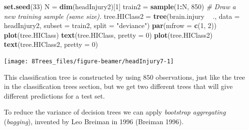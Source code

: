 \documentclass[10pt,ignorenonframetext,]{beamer}
\newenvironment{Shaded}{\begin{snugshade}}{\end{snugshade}}
\newcommand{\KeywordTok}[1]{\textcolor[rgb]{0.13,0.29,0.53}{\textbf{#1}}}
\newcommand{\DataTypeTok}[1]{\textcolor[rgb]{0.13,0.29,0.53}{#1}}
\newcommand{\DecValTok}[1]{\textcolor[rgb]{0.00,0.00,0.81}{#1}}
\newcommand{\StringTok}[1]{\textcolor[rgb]{0.31,0.60,0.02}{#1}}
\newcommand{\CommentTok}[1]{\textcolor[rgb]{0.56,0.35,0.01}{\textit{#1}}}
\newcommand{\OperatorTok}[1]{\textcolor[rgb]{0.81,0.36,0.00}{\textbf{#1}}}
\newcommand{\NormalTok}[1]{#1}
\begin{document}
\begin{frame}[fragile]

\scriptsize

\begin{Shaded}
\begin{Highlighting}[]
\KeywordTok{set.seed}\NormalTok{(}\DecValTok{33}\NormalTok{)}
\NormalTok{N =}\StringTok{ }\KeywordTok{dim}\NormalTok{(headInjury2)[}\DecValTok{1}\NormalTok{]}
\NormalTok{train2 =}\StringTok{ }\KeywordTok{sample}\NormalTok{(}\DecValTok{1}\OperatorTok{:}\NormalTok{N, }\DecValTok{850}\NormalTok{)  }\CommentTok{# Draw a new training sample (same size).}
\NormalTok{tree.HIClass2 =}\StringTok{ }\KeywordTok{tree}\NormalTok{(brain.injury }\OperatorTok{~}\StringTok{ }\NormalTok{., }\DataTypeTok{data =}\NormalTok{ headInjury2, }\DataTypeTok{subset =}\NormalTok{ train2, }
    \DataTypeTok{split =} \StringTok{"deviance"}\NormalTok{)}
\KeywordTok{par}\NormalTok{(}\DataTypeTok{mfrow =} \KeywordTok{c}\NormalTok{(}\DecValTok{1}\NormalTok{, }\DecValTok{2}\NormalTok{))}
\KeywordTok{plot}\NormalTok{(tree.HIClass)}
\KeywordTok{text}\NormalTok{(tree.HIClass, }\DataTypeTok{pretty =} \DecValTok{0}\NormalTok{)}
\KeywordTok{plot}\NormalTok{(tree.HIClass2)}
\KeywordTok{text}\NormalTok{(tree.HIClass2, }\DataTypeTok{pretty =} \DecValTok{0}\NormalTok{)}
\end{Highlighting}
\end{Shaded}

\begin{center}\texttt{[image: 8Trees\_files/figure-beamer/headInjury7-1]} \end{center}

\end{frame}

\begin{frame}

This classification tree is constructed by using \(850\) observations,
just like the tree in the classification trees section, but we get two
different trees that will give different predictions for a test set.

To reduce the variance of decision trees we can apply \emph{bootstrap
aggregating} (\emph{bagging}), invented by Leo Breiman in 1996 (Breiman
1996).

\end{frame}
\end{document}
